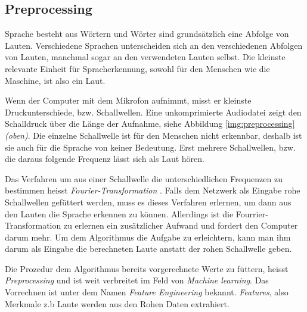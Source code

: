\subsection{Preprocessing}
Sprache besteht aus Wörtern und Wörter sind grundsätzlich eine Abfolge von Lauten. Verschiedene Sprachen unterscheiden sich an den verschiedenen Abfolgen von Lauten, manchmal sogar an den verwendeten Lauten selbst. Die kleinste relevante Einheit für Spracherkennung, sowohl für den Menschen wie die Maschine, ist also ein Laut.

Wenn der Computer mit dem Mikrofon aufnimmt, misst er kleinste Druckunterschiede, bzw. Schallwellen. Eine unkomprimierte Audiodatei zeigt den Schalldruck über die Länge der Aufnahme, siehe Abbildung \ref{img:preprocessing} \textit{(oben)}.
Die einzelne Schallwelle ist für den Menschen nicht erkennbar, deshalb ist sie auch für die Sprache von keiner Bedeutung. Erst mehrere Schallwellen, bzw. die daraus folgende Frequenz lässt sich als Laut hören. 

Das Verfahren um aus einer Schallwelle die unterschiedlichen Frequenzen zu bestimmen heisst \textit{Fourier-Transformation} \cite{fourrier}. Falls dem Netzwerk als Eingabe rohe Schallwellen gefüttert werden, muss es dieses Verfahren erlernen, um dann aus den Lauten die Sprache erkennen zu können. Allerdings ist die Fourrier-Transformation zu erlernen ein zusätzlicher Aufwand und fordert den Computer darum mehr. Um dem Algorithmus die Aufgabe zu erleichtern, kann man ihm darum als Eingabe die berechneten Laute anstatt der rohen Schallwelle geben.

Die Prozedur dem Algorithmus bereits vorgerechnete Werte zu füttern, heisst \textit{Preprocessing} und ist weit verbreitet im Feld von \textit{Machine learning}. Das Vorrechnen ist unter dem Namen \textit{Feature Engineering} bekannt. \textit{Features}, also Merkmale z.b Laute werden aus den Rohen Daten extrahiert. \parencite[vgl.][]{chollet}

